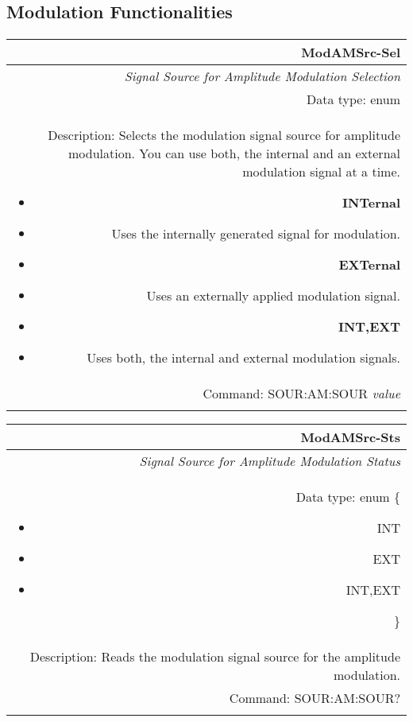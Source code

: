\documentclass[openany]{article}
\begin{document}
	\subsection{Modulation Functionalities}\label{pvgroup:function} %

		\paragraph{} %


		\begin{tabular}{N}
			\hline
			\bfseries ModAMSrc-Sel \\ \hline
			\emph{Signal Source for Amplitude Modulation Selection} \\
			Data type: enum \\  
			Description: Selects the modulation signal source for amplitude modulation. You can use both, the internal and an external modulation signal at a time.\begin{itemize}[noitemsep]
				\small
				\item[] \textbf{INTernal} 
				\item[]	Uses the internally generated signal for modulation.
				\item[] \textbf{EXTernal}
				\item[] Uses an externally applied modulation signal.
				\item[] \textbf{INT,EXT}
				\item[] Uses both, the internal and external modulation signals.
			\end{itemize} \\
			Command: SOUR:AM:SOUR \emph{value} \\
			\\

		\end{tabular}


		\begin{tabular}{N}
			\hline
			\bfseries ModAMSrc-Sts \\ \hline
			\emph{Signal Source for Amplitude Modulation Status} \\
			Data type: enum \{\begin{itemize}[noitemsep]
				\small
				\item[] INT
				\item[] EXT
				\item[] INT,EXT
			\end{itemize}\} \\ 
			Description: Reads the modulation signal source for the amplitude modulation. \\
			Command: SOUR:AM:SOUR? \\
			\\

		\end{tabular}
\end{document}
